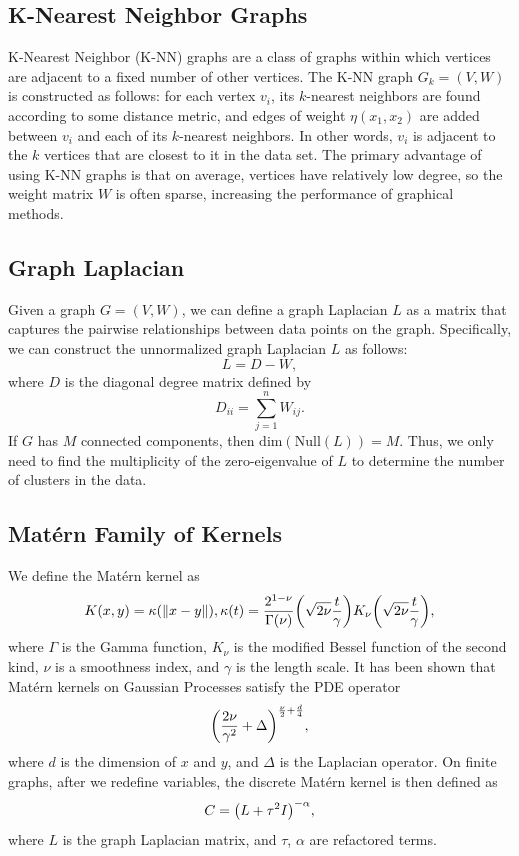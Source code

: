 \documentclass[12pt]{amsart}
\begin{document}
\subsection{K-Nearest Neighbor Graphs}
K-Nearest Neighbor (K-NN) graphs are a class of graphs within which vertices are adjacent to a fixed number of other vertices. The K-NN graph $G_k = (V, W)$ is constructed as follows: for each vertex $v_i$, its $k$-nearest neighbors are found according to some distance metric, and edges of weight $\eta(x_1,x_2)$ are added between $v_i$ and each of its $k$-nearest neighbors. In other words, $v_i$ is adjacent to the $k$ vertices that are closest to it in the data set. The primary advantage of using K-NN graphs is that on average, vertices have relatively low degree, so the weight matrix $W$ is often sparse, increasing the performance of graphical methods.

\subsection{Graph Laplacian}
Given a graph $G = (V, W)$, we can define a graph Laplacian $L$ as a matrix that captures the pairwise relationships between data points on the graph. Specifically, we can construct the unnormalized graph Laplacian $L$ as follows:
$$ L = D - W, $$
where $D$ is the diagonal degree matrix defined by
\[D_{ii} = \sum_{j = 1}^n W_{ij}.\]
If $G$ has $M$ connected components, then $\mathrm{dim}(\mathrm{Null}(L))=M$. Thus, we only need to find the multiplicity of the zero-eigenvalue of $L$ to determine the number of clusters in the data.

\subsection{Matérn Family of Kernels}
We define the Matérn kernel as
\[
  K(x,y) = \kappa({\left\|x-y\right\|}), \kappa(t) = \frac{2^{1-\nu}}{\Gamma(\nu)}{\left(\sqrt{2\nu}\frac{t}{\gamma}\right)}K_{\nu}{\left(\sqrt{2\nu}\frac{t}{\gamma}\right)},
\]
where $\Gamma$ is the Gamma function, $K_{\nu}$ is the modified Bessel function of the second kind, $\nu$ is a smoothness index, and $\gamma$ is the length scale. It has been shown that Matérn kernels on Gaussian Processes satisfy the PDE operator
\[
  {\left(\frac{2\nu}{\gamma ^2} + \Delta\right)}^{\frac{\nu}{2} + \frac{d}{4}},
\]
where $d$ is the dimension of $x$ and $y$, and $\Delta$ is the Laplacian operator. On finite graphs, after we redefine variables, the discrete Matérn kernel is then defined as
\[
  C = {\left(L + \tau^2 I\right)}^{-\alpha},
\]
where $L$ is the graph Laplacian matrix, and $\tau$, $\alpha$ are refactored terms.
\end{document}
